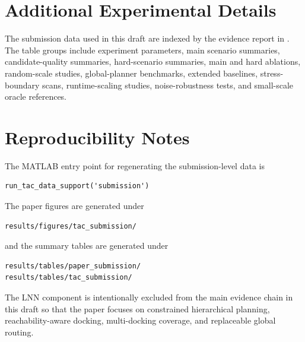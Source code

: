 \section{Additional Experimental Details}
\label{app:details}

The submission data used in this draft are indexed by the evidence report in . The table groups include experiment parameters, main scenario summaries, candidate-quality summaries, hard-scenario summaries, main and hard ablations, random-scale studies, global-planner benchmarks, extended baselines, stress-boundary scans, runtime-scaling studies, noise-robustness tests, and small-scale oracle references.

\section{Reproducibility Notes}
\label{app:reproducibility}

The MATLAB entry point for regenerating the submission-level data is
\begin{verbatim}
run_tac_data_support('submission')
\end{verbatim}
The paper figures are generated under
\begin{verbatim}
results/figures/tac_submission/
\end{verbatim}
and the summary tables are generated under
\begin{verbatim}
results/tables/paper_submission/
results/tables/tac_submission/
\end{verbatim}
The LNN component is intentionally excluded from the main evidence chain in this draft so that the paper focuses on constrained hierarchical planning, reachability-aware docking, multi-docking coverage, and replaceable global routing.

